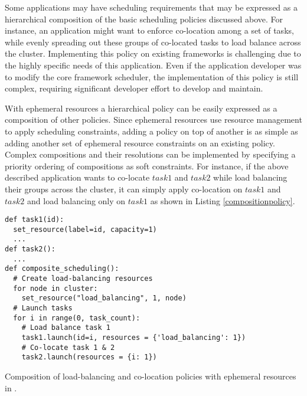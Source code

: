 
Some applications may have scheduling requirements that may be expressed as a hierarchical composition of the basic scheduling policies discussed above. For instance, an application might want to enforce co-location among a set of tasks, while evenly spreading out these groups of co-located tasks to load balance across the cluster. Implementing this policy on existing frameworks is challenging due to the highly specific needs of this application. Even if the application developer was to modify the core framework scheduler, the implementation of this policy is still complex, requiring significant developer effort to develop and maintain.

With ephemeral resources a hierarchical policy can be easily expressed as a composition of other policies. Since ephemeral resources use resource management to apply scheduling constraints, adding a policy on top of another is as simple as adding another set of ephemeral resource constraints on an existing policy. Complex compositions and their resolutions can be implemented by specifying a priority ordering of compositions as soft constraints. For instance, if the above described application wants to co-locate $task1$ and $task2$ while load balancing their groups across the cluster, it can simply apply co-location on $task1$ and $task2$ and load balancing only on $task1$ as shown in Listing \ref{compositionpolicy}.

\begin{listing}
\begin{verbatim}
def task1(id):
  set_resource(label=id, capacity=1)
  ...
def task2():
  ...
def composite_scheduling():
  # Create load-balancing resources
  for node in cluster:
    set_resource("load_balancing", 1, node)
  # Launch tasks
  for i in range(0, task_count):
    # Load balance task 1
    task1.launch(id=i, resources = {'load_balancing': 1})
    # Co-locate task 1 & 2
    task2.launch(resources = {i: 1})
\end{verbatim}
\caption{Composition of load-balancing and co-location policies with ephemeral resources in \name{}.}
\label{compositionpolicy}
\end{listing}

